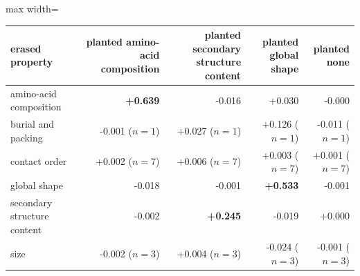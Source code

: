 \begin{adjustbox}{max width=\linewidth}
\begin{tabular}{lrrrr}
\toprule
\rowcolor{CompassLavender!32}
erased property & planted amino-acid composition & planted secondary structure content & planted global shape & planted none \\
\midrule
amino-acid composition & \textbf{+0.639} & -0.016 & +0.030 & -0.000 \\
burial and packing & -0.001 ($n=1$) & +0.027 ($n=1$) & +0.126 ($n=1$) & -0.011 ($n=1$) \\
contact order & +0.002 ($n=7$) & +0.006 ($n=7$) & +0.003 ($n=7$) & +0.001 ($n=7$) \\
global shape & -0.018 & -0.001 & \textbf{+0.533} & -0.001 \\
secondary structure content & -0.002 & \textbf{+0.245} & -0.019 & +0.000 \\
size & -0.002 ($n=3$) & +0.004 ($n=3$) & -0.024 ($n=3$) & -0.001 ($n=3$) \\
\bottomrule
\end{tabular}
\end{adjustbox}
